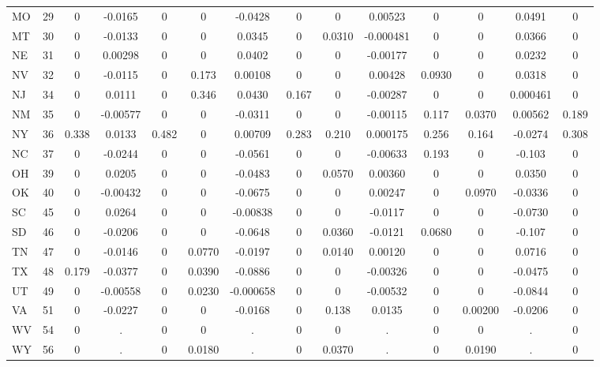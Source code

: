 \documentclass[]{article}
\begin{document}
\begin{tabular}{lccccccccccccc}
MO & 29 & 0 & -0.0165 & 0 & 0 & -0.0428 & 0 & 0 & 0.00523 & 0 & 0 & 0.0491 & 0 \\
MT & 30 & 0 & -0.0133 & 0 & 0 & 0.0345 & 0 & 0.0310 & -0.000481 & 0 & 0 & 0.0366 & 0 \\
NE & 31 & 0 & 0.00298 & 0 & 0 & 0.0402 & 0 & 0 & -0.00177 & 0 & 0 & 0.0232 & 0 \\
NV & 32 & 0 & -0.0115 & 0 & 0.173 & 0.00108 & 0 & 0 & 0.00428 & 0.0930 & 0 & 0.0318 & 0 \\
NJ & 34 & 0 & 0.0111 & 0 & 0.346 & 0.0430 & 0.167 & 0 & -0.00287 & 0 & 0 & 0.000461 & 0 \\
NM & 35 & 0 & -0.00577 & 0 & 0 & -0.0311 & 0 & 0 & -0.00115 & 0.117 & 0.0370 & 0.00562 & 0.189 \\
NY & 36 & 0.338 & 0.0133 & 0.482 & 0 & 0.00709 & 0.283 & 0.210 & 0.000175 & 0.256 & 0.164 & -0.0274 & 0.308 \\
NC & 37 & 0 & -0.0244 & 0 & 0 & -0.0561 & 0 & 0 & -0.00633 & 0.193 & 0 & -0.103 & 0 \\
OH & 39 & 0 & 0.0205 & 0 & 0 & -0.0483 & 0 & 0.0570 & 0.00360 & 0 & 0 & 0.0350 & 0 \\
OK & 40 & 0 & -0.00432 & 0 & 0 & -0.0675 & 0 & 0 & 0.00247 & 0 & 0.0970 & -0.0336 & 0 \\
SC & 45 & 0 & 0.0264 & 0 & 0 & -0.00838 & 0 & 0 & -0.0117 & 0 & 0 & -0.0730 & 0 \\
SD & 46 & 0 & -0.0206 & 0 & 0 & -0.0648 & 0 & 0.0360 & -0.0121 & 0.0680 & 0 & -0.107 & 0 \\
TN & 47 & 0 & -0.0146 & 0 & 0.0770 & -0.0197 & 0 & 0.0140 & 0.00120 & 0 & 0 & 0.0716 & 0 \\
TX & 48 & 0.179 & -0.0377 & 0 & 0.0390 & -0.0886 & 0 & 0 & -0.00326 & 0 & 0 & -0.0475 & 0 \\
UT & 49 & 0 & -0.00558 & 0 & 0.0230 & -0.000658 & 0 & 0 & -0.00532 & 0 & 0 & -0.0844 & 0 \\
VA & 51 & 0 & -0.0227 & 0 & 0 & -0.0168 & 0 & 0.138 & 0.0135 & 0 & 0.00200 & -0.0206 & 0 \\
WV & 54 & 0 & . & 0 & 0 & . & 0 & 0 & . & 0 & 0 & . & 0 \\
 WY & 56 & 0 & . & 0 & 0.0180 & . & 0 & 0.0370 & . & 0 & 0.0190 & . & 0 \\ \hline
\end{tabular}
\end{document}
